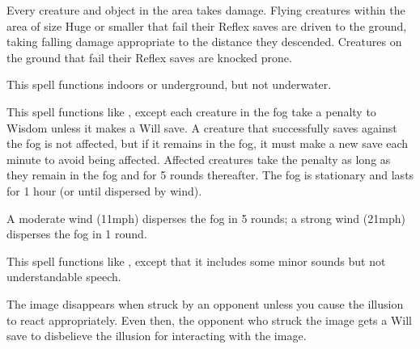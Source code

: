 \spellrng{\rngfar}
\begin{spelleffect}
  Every creature and object in the area takes damage. Flying creatures within the area of size Huge or smaller that fail their Reflex saves are driven to the ground, taking falling damage appropriate to the distance they descended. Creatures on the ground that fail their Reflex saves are knocked prone.
\end{spelleffect}
\begin{spellnotes}
  This spell functions indoors or underground, but not underwater.
\end{spellnotes}

\spellrng{\rngclose}
\begin{spelleffect}
  This spell functions like , except each creature in the fog take a  penalty to Wisdom unless it makes a Will save. A creature that successfully saves against the fog is not affected, but if it remains in the fog, it must make a new save each minute to avoid being affected. Affected creatures take the penalty as long as they remain in the fog and for 5 rounds thereafter. The fog is stationary and lasts for 1 hour (or until dispersed by wind).
\end{spelleffect}
\begin{spellnotes}
  A moderate wind (11\add mph) disperses the fog in 5 rounds; a strong wind (21\add mph) disperses the fog in 1 round.
\end{spellnotes}

\begin{spelleffect}
  This spell functions like , except that it includes some minor sounds but not understandable speech.
\end{spelleffect}
\begin{spellnotes}
  The image disappears when struck by an opponent unless you cause the illusion to react appropriately. Even then, the opponent who struck the image gets a Will save to disbelieve the illusion for interacting with the image.
\end{spellnotes}

